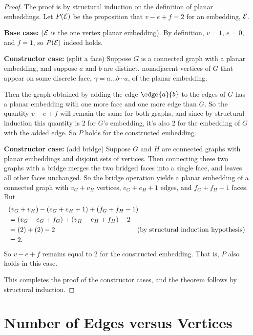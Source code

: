 \begin{proof}
The proof is by structural induction on the definition of planar
embeddings.  Let $P(\mathcal{E})$ be the proposition that $v - e + f = 2$ for an
embedding, $\mathcal{E}$.

\textbf{Base case:} ($\mathcal{E}$ is the one vertex planar embedding).
By definition, $v=1$, $e=0$, and $f=1$, so $P(\mathcal{E})$ indeed holds.

\textbf{Constructor case:} (split a face) Suppose $G$ is a connected graph
with a planar embedding, and suppose $a$ and $b$ are distinct, nonadjacent
vertices of $G$ that appear on some discrete face,
$\gamma= a \dots b \cdots a$, of the planar embedding.

Then the graph obtained by adding the edge $\edge{a}{b}$ to the edges of
$G$ has a planar embedding with one more face and one more edge than $G$.
So the quantity $v-e+f$ will remain the same for both graphs, and since by
structural induction this quantity is 2 for $G$'s embedding, it's also 2
for the embedding of $G$ with the added edge.  So $P$ holds for the
constructed embedding.

\textbf{Constructor case:} (add bridge) Suppose $G$ and $H$ are connected
graphs with planar embeddings and disjoint sets of vertices.  Then
connecting these two graphs with a bridge merges the two bridged faces
into a single face, and leaves all other faces unchanged.  So the bridge
operation yields a planar embedding of a connected graph with $v_G +v_H$
vertices, $e_G + e_H +1$ edges, and $f_G + f_H - 1$ faces.  But
\begin{align*}
\lefteqn{(v_G +v_H) - (e_G + e_H +1) + (f_G + f_H - 1)}\\
   & = (v_G  - e_G + f_G) + (v_H  - e_H  + f_H) -2\\
   & = (2)+(2)-2 & \text{(by structural induction hypothesis)}\\
   & = 2.
\end{align*}
So $v-e+f$ remains equal to 2 for the constructed embedding.  That is, $P$
also holds in this case.

This completes the proof of the constructor cases, and the theorem follows
by structural induction.
\end{proof}

\section{Number of Edges versus Vertices}

